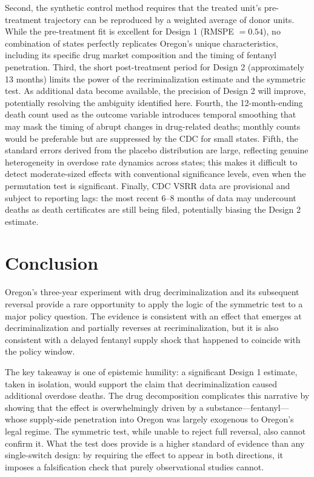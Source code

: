\documentclass[12pt]{article}
\begin{document}
Second, the synthetic control method requires that the treated unit's pre-treatment trajectory can be reproduced by a weighted average of donor units. While the pre-treatment fit is excellent for Design 1 (RMSPE $= 0.54$), no combination of states perfectly replicates Oregon's unique characteristics, including its specific drug market composition and the timing of fentanyl penetration. Third, the short post-treatment period for Design 2 (approximately 13 months) limits the power of the recriminalization estimate and the symmetric test. As additional data become available, the precision of Design 2 will improve, potentially resolving the ambiguity identified here. Fourth, the 12-month-ending death count used as the outcome variable introduces temporal smoothing that may mask the timing of abrupt changes in drug-related deaths; monthly counts would be preferable but are suppressed by the CDC for small states. Fifth, the standard errors derived from the placebo distribution are large, reflecting genuine heterogeneity in overdose rate dynamics across states; this makes it difficult to detect moderate-sized effects with conventional significance levels, even when the permutation test is significant. Finally, CDC VSRR data are provisional and subject to reporting lags: the most recent 6--8 months of data may undercount deaths as death certificates are still being filed, potentially biasing the Design 2 estimate.


\section{Conclusion}

Oregon's three-year experiment with drug decriminalization and its subsequent reversal provide a rare opportunity to apply the logic of the symmetric test to a major policy question. The evidence is consistent with an effect that emerges at decriminalization and partially reverses at recriminalization, but it is also consistent with a delayed fentanyl supply shock that happened to coincide with the policy window.

The key takeaway is one of epistemic humility: a significant Design 1 estimate, taken in isolation, would support the claim that decriminalization caused additional overdose deaths. The drug decomposition complicates this narrative by showing that the effect is overwhelmingly driven by a substance---fentanyl---whose supply-side penetration into Oregon was largely exogenous to Oregon's legal regime. The symmetric test, while unable to reject full reversal, also cannot confirm it. What the test does provide is a higher standard of evidence than any single-switch design: by requiring the effect to appear in both directions, it imposes a falsification check that purely observational studies cannot.
\end{document}
